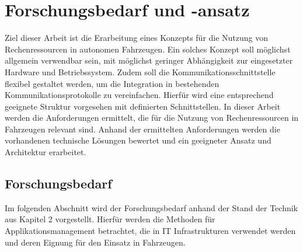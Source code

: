 \chapter{Forschungsbedarf und -ansatz}

Ziel dieser Arbeit ist die Erarbeitung eines Konzepts für die Nutzung von Rechenressourcen in autonomen Fahrzeugen. Ein solches Konzept soll möglichst allgemein verwendbar sein, mit möglichst geringer Abhängigkeit zur eingesetzter Hardware und Betriebssystem. Zudem soll die Kommunikationsschnittstelle flexibel gestaltet werden, um die Integration in bestehenden Kommunikationsprotokolle zu vereinfachen. Hierfür wird eine entsprechend geeignete Struktur vorgesehen mit definierten Schnittstellen. In dieser Arbeit werden die Anforderungen ermittelt, die für die Nutzung von Rechenressourcen in Fahrzeugen relevant sind. Anhand der ermittelten Anforderungen werden die vorhandenen technische Lösungen bewertet und ein geeigneter Ansatz und Architektur erarbeitet.

\section{Forschungsbedarf}

Im folgenden Abschnitt wird der Forschungsbedarf anhand der Stand der Technik aus Kapitel 2 vorgestellt. Hierfür werden die Methoden für Applikationsmanagement betrachtet, die in IT Infrastrukturen verwendet werden und deren Eignung für den Einsatz in Fahrzeugen. 

